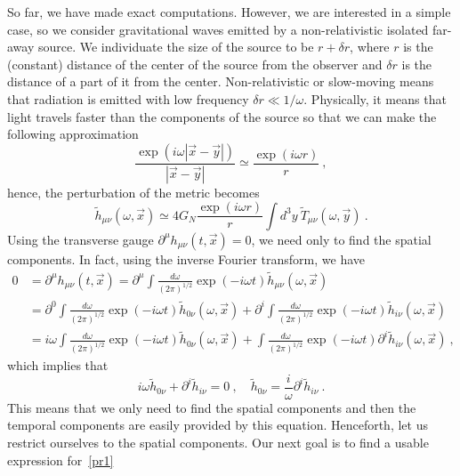 \documentclass[a4paper]{article}
\begin{document}
    So far, we have made exact computations. However, we are interested in a simple case, so we consider gravitational waves emitted by a non-relativistic isolated far-away source. We individuate the size of the source to be $r + \delta r$, where $r$ is the (constant) distance of the center of the source from the observer and $\delta r$ is the distance of a part of it from the center. Non-relativistic or slow-moving means that radiation is emitted with low frequency $\delta r \ll 1 / \omega$. Physically, it means that light travels faster than the components of the source so that we can make the following approximation
    \begin{equation*}
        \frac{\exp(i \omega |\vec x - \vec y|)}{|\vec x - \vec y|} \simeq \frac{\exp(i \omega r)}{r} ~, 
    \end{equation*}
    hence, the perturbation of the metric becomes
    \begin{equation}\label{pr1}
        \tilde h_{\mu\nu} (\omega, \vec x) \simeq 4 G_N \frac{\exp(i \omega r)}{r} \int d^3 y ~ \tilde T_{\mu\nu} (\omega, \vec{y}) ~.
    \end{equation}
    Using the transverse gauge $\partial^\mu h_{\mu\nu} (t, \vec x) = 0$, we need only to find the spatial components. In fact, using the inverse Fourier transform, we have 
    \begin{equation*}
    \begin{aligned}
        0 & = \partial^\mu h_{\mu\nu} (t, \vec x) = \partial^\mu \int \frac{d\omega}{(2\pi)^{1/2}} \exp(- i \omega t) \tilde h_{\mu\nu} (\omega, \vec x) \\ & = \partial^0 \int \frac{d\omega}{(2\pi)^{1/2}} \exp(- i \omega t) \tilde h_{0\nu} (\omega, \vec x) + \partial^i \int \frac{d\omega}{(2\pi)^{1/2}} \exp(- i \omega t) \tilde h_{i\nu} (\omega, \vec x) \\ & = i \omega \int \frac{d\omega}{(2\pi)^{1/2}} \exp(- i \omega t) \tilde h_{0\nu} (\omega, \vec x) + \int \frac{d\omega}{(2\pi)^{1/2}} \exp(- i \omega t) \partial^i \tilde h_{i\nu} (\omega, \vec x) ~,
    \end{aligned}
    \end{equation*}
    which implies that 
    \begin{equation*}
        i \omega \tilde h_{0 \nu} + \partial^i \tilde h_{i \nu} = 0 ~, \quad \tilde h_{0\nu} = \frac{i}{\omega} \partial^i \tilde h_{i \nu} ~.
    \end{equation*}
    This means that we only need to find the spatial components and then the temporal components are easily provided by this equation. Henceforth, let us restrict ourselves to the spatial components. Our next goal is to find a usable expression for~\eqref{pr1}
\end{document}
